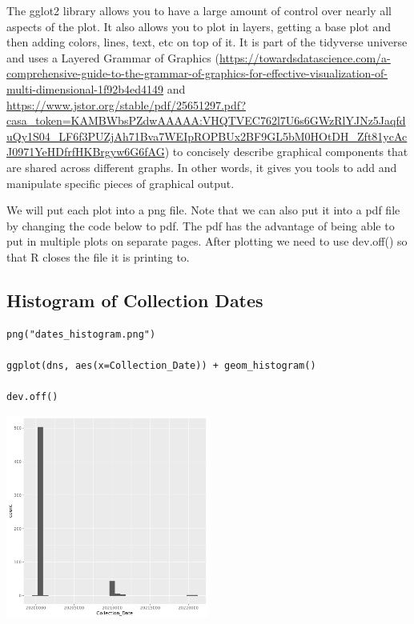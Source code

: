 \documentclass[
]{book}
\begin{document}
The gglot2 library allows you to have a large amount of control over nearly all aspects of the plot. It also allows you to plot in layers, getting a base plot and then adding colors, lines, text, etc on top of it. It is part of the tidyverse universe and uses a Layered Grammar of Graphics (\url{https://towardsdatascience.com/a-comprehensive-guide-to-the-grammar-of-graphics-for-effective-visualization-of-multi-dimensional-1f92b4ed4149} and \url{https://www.jstor.org/stable/pdf/25651297.pdf?casa_token=KAMBWbsPZdwAAAAA:VHQTVEC762l7U6s6GWzRlYJNz5JaqfduQy1S04_LF6f3PUZjAh71Bva7WEIpROPBUx2BF9GL5bM0HOtDH_Zft81ycAcJ0971YeHDfrfHKBrgyw6G6fAG}) to concisely describe graphical components that are shared across different graphs. In other words, it gives you tools to add and manipulate specific pieces of graphical output.

We will put each plot into a png file. Note that we can also put it into a pdf file by changing the code below to pdf. The pdf has the advantage of being able to put in multiple plots on separate pages. After plotting we need to use dev.off() so that R closes the file it is printing to.

\hypertarget{histogram-of-collection-dates}{%
\subsection{Histogram of Collection Dates}\label{histogram-of-collection-dates}}

\begin{verbatim}
png("dates_histogram.png")

ggplot(dns, aes(x=Collection_Date)) + geom_histogram()

dev.off()
\end{verbatim}

\includegraphics[width=0.5\textwidth,height=\textheight]{./Figures/dates_histogram.png}
\end{document}
